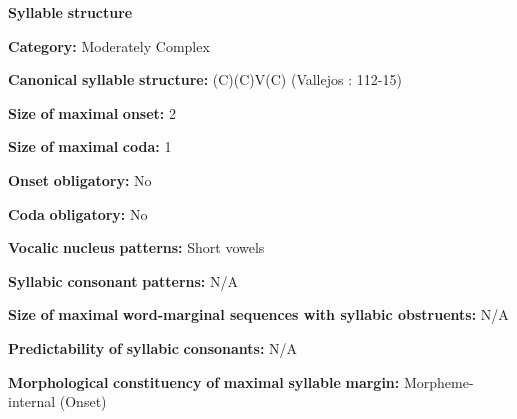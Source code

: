 \documentclass[output=paper]{langsci/langscibook}
\begin{document}
\begin{styleBody}
\textbf{Syllable} \textbf{structure}
\end{styleBody}

\begin{styleBody}
\textbf{Category:} Moderately Complex
\end{styleBody}

\begin{styleBody}
\textbf{Canonical} \textbf{syllable} \textbf{structure:} (C)(C)V(C) (Vallejos \citealt{Yopán2010}: 112-15)
\end{styleBody}

\begin{styleBody}
\textbf{Size} \textbf{of} \textbf{maximal} \textbf{onset:} 2
\end{styleBody}

\begin{styleBody}
\textbf{Size} \textbf{of} \textbf{maximal} \textbf{coda:} 1
\end{styleBody}

\begin{styleBody}
\textbf{Onset} \textbf{obligatory:} No
\end{styleBody}

\begin{styleBody}
\textbf{Coda} \textbf{obligatory:} No
\end{styleBody}

\begin{styleBody}
\textbf{Vocalic} \textbf{nucleus} \textbf{patterns:} Short vowels
\end{styleBody}

\begin{styleBody}
\textbf{Syllabic} \textbf{consonant} \textbf{patterns:} N/A
\end{styleBody}

\begin{styleBody}
\textbf{Size} \textbf{of} \textbf{maximal} \textbf{word{}-marginal sequences with syllabic obstruents:} N/A
\end{styleBody}

\begin{styleBody}
\textbf{Predictability} \textbf{of} \textbf{syllabic} \textbf{consonants:} N/A
\end{styleBody}

\begin{styleBody}
\textbf{Morphological} \textbf{constituency} \textbf{of} \textbf{maximal} \textbf{syllable} \textbf{margin:} Morpheme-internal (Onset)
\end{styleBody}
\end{document}
